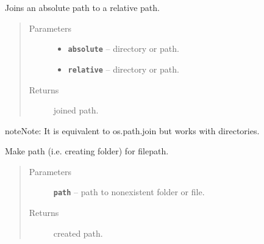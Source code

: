 \documentclass[letterpaper,10pt,english]{sphinxmanual}
\begin{document}
\begin{fulllineitems}
\label{RRtoolbox.lib:RRtoolbox.lib.directory.joinPath}
Joins an absolute path to a relative path.
\begin{quote}\begin{description}
\item[{Parameters}] \leavevmode\begin{itemize}
\item {} 
\textbf{\texttt{absolute}} -- directory or path.

\item {} 
\textbf{\texttt{relative}} -- directory or path.

\end{itemize}

\item[{Returns}] \leavevmode
joined path.

\end{description}\end{quote}

\begin{notice}{note}{Note:}
It is equivalent to os.path.join but works with directories.
\end{notice}

\end{fulllineitems}


\begin{fulllineitems}
\label{RRtoolbox.lib:RRtoolbox.lib.directory.mkPath}
Make path (i.e. creating folder) for filepath.
\begin{quote}\begin{description}
\item[{Parameters}] \leavevmode
\textbf{\texttt{path}} -- path to nonexistent folder or file.

\item[{Returns}] \leavevmode
created path.

\end{description}\end{quote}

\end{fulllineitems}

\end{document}
